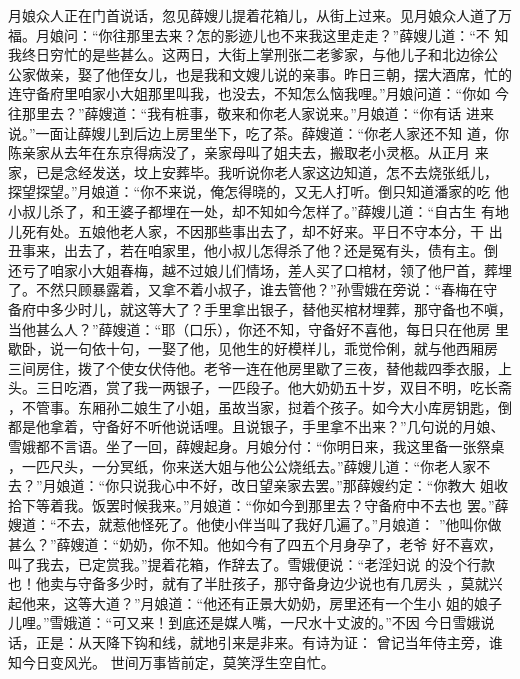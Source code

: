 月娘众人正在门首说话，忽见薛嫂儿提着花箱儿，从街上过来。见月娘众人道了万
福。月娘问：“你往那里去来？怎的影迹儿也不来我这里走走？”薛嫂儿道：“不
知我终日穷忙的是些甚么。这两日，大街上掌刑张二老爹家，与他儿子和北边徐公
公家做亲，娶了他侄女儿，也是我和文嫂儿说的亲事。昨日三朝，摆大酒席，忙的
连守备府里咱家小大姐那里叫我，也没去，不知怎么恼我哩。”月娘问道：“你如
今往那里去？”薛嫂道：“我有桩事，敬来和你老人家说来。”月娘道：“你有话
进来说。”一面让薛嫂儿到后边上房里坐下，吃了茶。薛嫂道：“你老人家还不知
道，你陈亲家从去年在东京得病没了，亲家母叫了姐夫去，搬取老小灵柩。从正月
来家，已是念经发送，坟上安葬毕。我听说你老人家这边知道，怎不去烧张纸儿，
探望探望。”月娘道：“你不来说，俺怎得晓的，又无人打听。倒只知道潘家的吃
他小叔儿杀了，和王婆子都埋在一处，却不知如今怎样了。”薛嫂儿道：“自古生
有地儿死有处。五娘他老人家，不因那些事出去了，却不好来。平日不守本分，干
出丑事来，出去了，若在咱家里，他小叔儿怎得杀了他？还是冤有头，债有主。倒
还亏了咱家小大姐春梅，越不过娘儿们情场，差人买了口棺材，领了他尸首，葬埋
了。不然只顾暴露着，又拿不着小叔子，谁去管他？”孙雪娥在旁说：“春梅在守
备府中多少时儿，就这等大了？手里拿出银子，替他买棺材埋葬，那守备也不嗔，
当他甚么人？”薛嫂道：“耶（口乐），你还不知，守备好不喜他，每日只在他房
里歇卧，说一句依十句，一娶了他，见他生的好模样儿，乖觉伶俐，就与他西厢房
三间房住，拨了个使女伏侍他。老爷一连在他房里歇了三夜，替他裁四季衣服，上
头。三日吃酒，赏了我一两银子，一匹段子。他大奶奶五十岁，双目不明，吃长斋
，不管事。东厢孙二娘生了小姐，虽故当家，挝着个孩子。如今大小库房钥匙，倒
都是他拿着，守备好不听他说话哩。且说银子，手里拿不出来？”几句说的月娘、
雪娥都不言语。坐了一回，薛嫂起身。月娘分付：“你明日来，我这里备一张祭桌
，一匹尺头，一分冥纸，你来送大姐与他公公烧纸去。”薛嫂儿道：“你老人家不
去？”月娘道：“你只说我心中不好，改日望亲家去罢。”那薛嫂约定：“你教大
姐收拾下等着我。饭罢时候我来。”月娘道：“你如今到那里去？守备府中不去也
罢。”薛嫂道：“不去，就惹他怪死了。他使小伴当叫了我好几遍了。”月娘道：
”他叫你做甚么？”薛嫂道：“奶奶，你不知。他如今有了四五个月身孕了，老爷
好不喜欢，叫了我去，已定赏我。”提着花箱，作辞去了。雪娥便说：“老淫妇说
的没个行款也！他卖与守备多少时，就有了半肚孩子，那守备身边少说也有几房头
，莫就兴起他来，这等大道？”月娘道：“他还有正景大奶奶，房里还有一个生小
姐的娘子儿哩。”雪娥道：“可又来！到底还是媒人嘴，一尺水十丈波的。”不因
今日雪娥说话，正是：从天降下钩和线，就地引来是非来。有诗为证：
曾记当年侍主旁，谁知今日变风光。
世间万事皆前定，莫笑浮生空自忙。